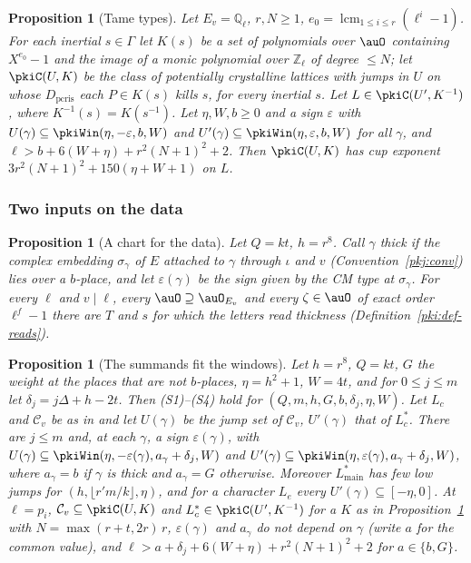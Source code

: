 \documentclass[10pt]{amsart}
\newtheorem{proposition}[theorem]{Proposition}
\theoremstyle{definition}
\theoremstyle{remark}
\newcommand{\Z}{\mathbb Z}
\newcommand{\Q}{\mathbb Q}
\begin{document}
\begin{proposition}[Tame types]\label{pki:tame}
Let $E_v=\Q_\ell$, $r,N\ge1$, $e_0=\operatorname{lcm}_{1\le i\le r}(\ell^i-1)$. For each inertial
$s\in\Gamma$ let $K(s)$ be a set of polynomials over $\auO$ containing $X^{e_0}-1$ and the image of a
monic polynomial over $\Z_\ell$ of degree $\le N$; let $\pkiC(U,K)$ be the class of potentially
crystalline lattices with jumps in $U$ on whose $D_{\mathrm{pcris}}$ each $P\in K(s)$ kills $s$, for
every inertial $s$. Let $L\in\pkiC(U',K^{-1})$, where $K^{-1}(s)=K(s^{-1})$. Let $\eta,W,b\ge0$ and
a sign $\varepsilon$ with $U(\gamma)\subseteq\pkiWin(\eta,-\varepsilon,b,W)$ and
$U'(\gamma)\subseteq\pkiWin(\eta,\varepsilon,b,W)$ for all $\gamma$, and
$\ell>b+6(W+\eta)+r^2(N+1)^2+2$. Then $\pkiC(U,K)$ has cup exponent
$3r^2(N+1)^2+150(\eta+W+1)$ on $L$.
\end{proposition}

\subsubsection*{Two inputs on the data}

\begin{proposition}[A chart for the data]\label{pki:chart}
Let $Q=kt$, $h=r^8$. Call $\gamma$ thick if the complex embedding $\sigma_\gamma$ of $E$ attached to
$\gamma$ through $\iota$ and $v$ (Convention~\ref{pkj:conv}) lies over a $b$-place, and let
$\varepsilon(\gamma)$ be the sign given by the CM type at $\sigma_\gamma$. For every $\ell$ and $v\mid\ell$,
every $\auO\supseteq\auO_{E_v}$ and every $\zeta\in\auO$ of exact order $\ell^f-1$ there are $T$ and $s$
for which the letters read thickness (Definition~\ref{pki:def-reads}).
\end{proposition}

\begin{proposition}[The summands fit the windows]\label{pki:data}
Let $h=r^8$, $Q=kt$, $G$ the weight at the places that are not $b$-places, $\eta=h^2+1$, $W=4t$, and
for $0\le j\le m$ let $\delta_j=j\Delta+h-2t$. Then (S1)--(S4) hold for $(Q,m,h,G,b,\delta_j,\eta,W)$.
Let $L_c$ and $\mathcal C_v$ be as in {\cite[Proposition~5.2]{P55}} and let $U(\gamma)$ be the jump set
of $\mathcal C_v$, $U'(\gamma)$ that of $L_c^*$. There are $j\le m$ and, at each $\gamma$, a sign
$\varepsilon(\gamma)$, with $U(\gamma)\subseteq\pkiWin(\eta,-\varepsilon(\gamma),a_\gamma+\delta_j,W)$
and $U'(\gamma)\subseteq\pkiWin(\eta,\varepsilon(\gamma),a_\gamma+\delta_j,W)$, where $a_\gamma=b$ if
$\gamma$ is thick and $a_\gamma=G$ otherwise. Moreover $L_{\mathrm{main}}^*$ has few low jumps for
$(h,\lfloor r'm/k\rfloor,\eta)$, and for a character $L_e$ every $U'(\gamma)\subseteq[-\eta,0]$.
At $\ell=p_i$, $\mathcal C_v\subseteq\pkiC(U,K)$ and $L_c^*\in\pkiC(U',K^{-1})$ for a $K$ as in
Proposition~\ref{pki:tame} with $N=\max(r+t,2r)\,r$, $\varepsilon(\gamma)$ and $a_\gamma$ do not depend on $\gamma$ (write $a$ for the common value), and
$\ell>a+\delta_j+6(W+\eta)+r^2(N+1)^2+2$ for $a\in\{b,G\}$.
\end{proposition}
\end{document}
